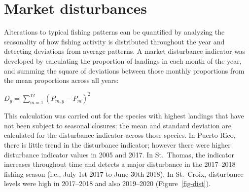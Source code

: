 \documentclass[
  letterpaper,
  oneside,
  open=any]{scrbook}
\begin{document}
\section{Market disturbances}\label{market-disturbances}

Alterations to typical fishing patterns can be quantified by analyzing
the seasonality of how fishing activity is distributed throughout the
year and detecting deviations from average patterns. A market
disturbance indicator was developed by calculating the proportion of
landings in each month of the year, and summing the square of deviations
between those monthly proportions from the mean proportions across all
years:

\(D_y = \sum_{m=1}^{12} (P_{m,y} - \overline{P}_m)^2\)

This calculation was carried out for the species with highest landings
that have not been subject to seasonal closures; the mean and standard
deviation are calculated for the disturbance indicator across those
species. In Puerto Rico, there is little trend in the disturbance
indicator; however there were higher disturbance indicator values in
2005 and 2017. In St.~Thomas, the indicator increases throughout time
and detects a major disturbance in the 2017--2018 fishing season (i.e.,
July 1st 2017 to June 30th 2018). In St.~Croix, disturbance levels were
high in 2017--2018 and also 2019--2020 (Figure~\ref{fig-dist}).
\end{document}
